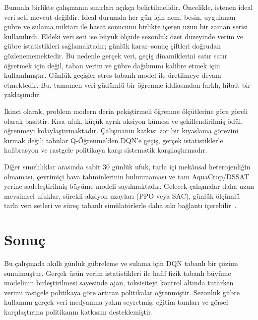 \documentclass[10pt,twocolumn,a4paper]{article}
\begin{document}
Bununla birlikte \c{c}al{\i}\c{s}man{\i}n s{\i}n{\i}rlar{\i} a\c{c}{\i}k\c{c}a belirtilmelidir. \"Oncelikle, istenen ideal veri seti mevcut de\u{g}ildir. {\.I}deal durumda her g\"un i\c{c}in nem, besin, uygulanan g\"ubre ve sulama miktar{\i} ile hasat sonucunu birlikte i\c{c}eren uzun bir zaman serisi kullan{\i}l{\i}rd{\i}. Eldeki veri seti ise b\"uy\"uk \"ol\c{c}\"ude sezonluk \"ozet d\"uzeyinde verim ve g\"ubre istatistikleri sa\u{g}lamaktad{\i}r; g\"unl\"uk karar--sonu\c{c} \c{c}iftleri do\u{g}rudan g\"ozlenememektedir. Bu nedenle ger\c{c}ek veri, ge\c{c}i\c{s} dinamiklerini sat{\i}r sat{\i}r \"o\u{g}retmek i\c{c}in de\u{g}il, taban verim ve g\"ubre da\u{g}{\i}l{\i}m{\i}n{\i} kalibre etmek i\c{c}in kullan{\i}lm{\i}\c{s}t{\i}r. G\"unl\"uk ge\c{c}i\c{s}ler stres tabanl{\i} model ile \"uretilmeye devam etmektedir. Bu, tamamen veri-g\"ud\"uml\"u bir \"o\u{g}renme iddias{\i}ndan farkl{\i}, hibrit bir yakla\c{s}{\i}md{\i}r.

{\.I}kinci olarak, problem modern derin peki\c{s}tirmeli \"o\u{g}renme \"ol\c{c}\"utlerine g\"ore g\"oreli olarak basittir. K{\i}sa ufuk, k\"u\c{c}\"uk ayr{\i}k aksiyon k\"umesi ve \c{s}ekillendirilmi\c{s} \"od\"ul, \"o\u{g}renmeyi kolayla\c{s}t{\i}rmaktad{\i}r. \c{C}al{\i}\c{s}man{\i}n katk{\i}s{\i} zor bir k{\i}yaslama g\"orevini k{\i}rmak de\u{g}il; tabular Q-\"O\u{g}renme'den DQN'e ge\c{c}i\c{s}, ger\c{c}ek istatistiklerle kalibrasyon ve rastgele politikaya kar\c{s}{\i} sistematik kar\c{s}{\i}la\c{s}t{\i}rmad{\i}r.

Di\u{g}er s{\i}n{\i}rl{\i}l{\i}klar aras{\i}nda sabit 30 g\"unl\"uk ufuk, tarla i\c{c}i mek\^ansal heterojenli\u{g}in olmamas{\i}, \c{c}evrimi\c{c}i hava tahminlerinin bulunmamas{\i} ve tam AquaCrop/DSSAT yerine sadele\c{s}tirilmi\c{s} b\"uy\"ume modeli say{\i}lmaktad{\i}r. Gelecek \c{c}al{\i}\c{s}malar daha uzun mevsimsel ufuklar, s\"urekli aksiyon uzaylar{\i} (PPO veya SAC), g\"unl\"uk \"ol\c{c}\"uml\"u tarla veri setleri ve s\"ure\c{c} tabanl{\i} sim\"ulat\"orlerle daha s{\i}k{\i} ba\u{g}lant{\i} i\c{c}erebilir~\cite{overweg2021cropgym}.

\section{Sonu\c{c}}
Bu \c{c}al{\i}\c{s}mada ak{\i}ll{\i} g\"unl\"uk g\"ubreleme ve sulama i\c{c}in DQN tabanl{\i} bir \c{c}\"oz\"um sunulmu\c{s}tur. Ger\c{c}ek \"ur\"un verim istatistikleri ile hafif fizik tabanl{\i} b\"uy\"ume modelinin birle\c{s}tirilmesi sayesinde ajan, toksisiteyi kontrol alt{\i}nda tutarken verimi rastgele politikaya g\"ore art{\i}ran politikalar \"o\u{g}renmi\c{s}tir. Sezonluk g\"ubre kullan{\i}m{\i} ger\c{c}ek veri medyan{\i}na yak{\i}n seyretmi\c{s}; e\u{g}itim tan{\i}lar{\i} ve g\"orsel kar\c{s}{\i}la\c{s}t{\i}rma politikan{\i}n katk{\i}s{\i}n{\i} desteklemi\c{s}tir.
\end{document}
